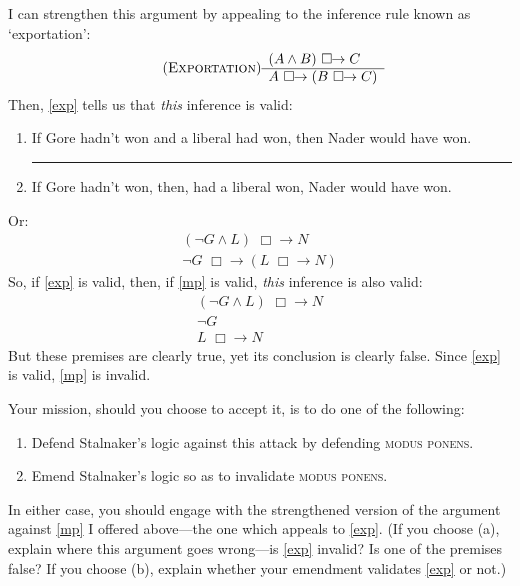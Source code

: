 \documentclass[10pt,leqno]{article}
\newcommand{\qe}{\begin{enumerate}}
\newcommand{\ze}{\end{enumerate}}
\newcommand{\p}{\item}
\newcommand{\e}{\emph}
\newcommand{\argu}[2]{\begin{center}
\begin{minipage}{#1}
	\begin{enumerate}
	#2
	\end{enumerate}
\end{minipage}
\end{center}}
\newcommand{\s}{\textsc}
\newcommand{\would}{ \,\,\Box\!\!\to }
\newcommand{\thus}{

\vspace{5pt}\hrule

}
\begin{document}
	I can strengthen this argument by appealing to the inference rule known as `exportation':
			\[\tag{\s{Exportation}}\label{exp}
			\begin{array}{l}
			(A \wedge B) \would C							\\\hline
			A \would (B \would C)
			\end{array}
		\]
Then, \ref{exp} tells us that \e{this} inference is valid:
		\argu{300pt}{
		\p[] If Gore hadn't won and a liberal had won, then Nader would have won.
		\thus
		\p[] If Gore hadn't won, then, had a liberal won, Nader would have won.
		}
Or:
	\[
	\begin{array}{l}
	(\neg G \wedge L) \would N		\\\hline
	\neg G \would (L \would N)
	\end{array}
	\]
So, if \ref{exp} is valid, then, if \ref{mp} is valid, \e{this} inference is also valid:
		\[
	\begin{array}{l}
	(\neg G \wedge L) \would N		\\
	\neg G												\\\hline
	L \would N
	\end{array}
	\]
But these premises are clearly true, yet its conclusion is clearly false.   Since \ref{exp} is valid, \ref{mp} is invalid.

Your mission, should you choose to accept it, is to do one of the following:
	\qe
	\p Defend Stalnaker's logic against this attack by defending \s{modus ponens}.
	\p Emend Stalnaker's logic so as to invalidate \s{modus ponens}.
	\ze 
In either case, you should engage with the strengthened version of the argument against \ref{mp} I offered above---the one which appeals to \ref{exp}.  (If you choose (a), explain where this argument goes wrong---is \ref{exp} invalid?  Is one of the premises false?  If you choose (b), explain whether your emendment validates \ref{exp} or not.) 
\end{document}
